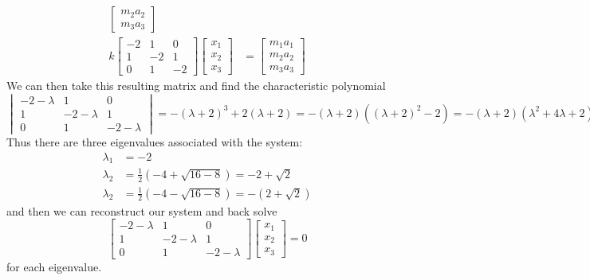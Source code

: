\documentclass{article}
\begin{document}
\begin{solution}
\begin{align*}
\begin{bmatrix}
m_{2}a_{2}\\
m_{3}a_{3}
\end{bmatrix}
\\
k
\begin{bmatrix}
-2	&	1	&	0\\
1	&	-2	&	1\\
0	&	1	&	-2
\end{bmatrix}
\begin{bmatrix}
x_{1}\\
x_{2}\\
x_{3}
\end{bmatrix}
&=
\begin{bmatrix}
m_{1}a_{1}\\
m_{2}a_{2}\\
m_{3}a_{3}
\end{bmatrix}
\end{align*}
We can then take this resulting matrix and find the characteristic polynomial
\[ 
\begin{vmatrix}
-2-\lambda	&	1	&	0\\
1	&	-2-\lambda	&	1\\
0	&	1	&	-2-\lambda
\end{vmatrix}
=  -(\lambda+2)^{3}+2(\lambda+2) 
= -(\lambda+2)((\lambda+2)^{2}-2) 
= -(\lambda+2)(\lambda^{2}+4\lambda+2)
\]
Thus there are three eigenvalues associated with the system:
\begin{align*}
\lambda_{1} &= \boxed{-2}\\
\lambda_{2} &= \frac{1}{2}(-4+\sqrt{16-8}) = \boxed{-2+\sqrt{2}}\\
\lambda_{2} &= \frac{1}{2}(-4-\sqrt{16-8}) = \boxed{-(2+\sqrt{2})}
\end{align*}
and then we can reconstruct our system and back solve
\[
\begin{bmatrix}
-2-\lambda	&	1	&	0\\
1	&	-2-\lambda	&	1\\
0	&	1	&	-2-\lambda
\end{bmatrix}
\begin{bmatrix}
x_{1}\\
x_{2}\\
x_{3}
\end{bmatrix}
= 0
\]
for each eigenvalue.


\end{solution}
\end{document}
